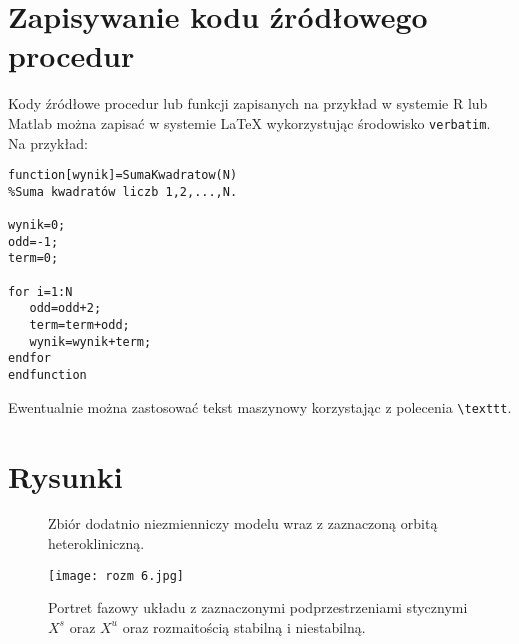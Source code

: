 \documentclass[a4paper,12pt,twoside,polish]{book}
\theoremstyle{definition}
\theoremstyle{plain}
\theoremstyle{definition}
\begin{document}
\section{Zapisywanie kodu źródłowego procedur}

Kody źródłowe procedur lub funkcji zapisanych na przykład w systemie R lub Matlab można zapisać w systemie {\LaTeX} wykorzystując środowisko \verb+verbatim+. Na przykład:
\begin{verbatim}
function[wynik]=SumaKwadratow(N)
%Suma kwadratów liczb 1,2,...,N.

wynik=0;
odd=-1;
term=0;

for i=1:N
   odd=odd+2;
   term=term+odd;
   wynik=wynik+term;
endfor
endfunction
\end{verbatim}

\noindent Ewentualnie można zastosować tekst maszynowy korzystając z polecenia \verb+\texttt+.



\section{Rysunki}
\begin{figure}[!ht]
    \centering
{}
    \caption{Zbiór dodatnio niezmienniczy modelu wraz z zaznaczoną orbitą heterokliniczną.}
    \label{rysmodelfktrojkat}
\end{figure}

\begin{figure}
\centering
\texttt{[image: rozm 6.jpg]}
\caption{Portret fazowy układu z zaznaczonymi podprzestrzeniami stycznymi $X^s$ oraz $X^u$ oraz rozmaitością stabilną i niestabilną.}
\label{rys rozm 6}
\end{figure}
\end{document}
